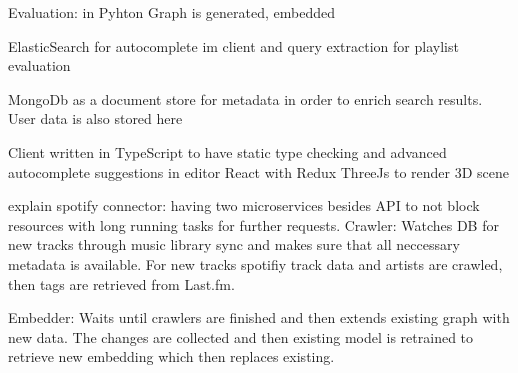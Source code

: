 \documentclass[a4paper]{llncs}
\begin{document}
	
	Evaluation:
	in Pyhton
	Graph is generated, embedded 
	
	
	ElasticSearch for autocomplete im client and query extraction for playlist evaluation
	
	MongoDb as a document store for metadata in order to enrich search results. User data is also stored here
	
	
	Client
	written in TypeScript to have static type checking and advanced autocomplete suggestions in editor
	React with Redux 
	ThreeJs to render 3D scene
	
	
	explain spotify connector:
	having two microservices besides API to not block resources with long running tasks for further requests. 
	Crawler: Watches DB for new tracks through music library sync and makes sure that all neccessary metadata is available. For new tracks spotifiy track data and artists are crawled, then tags are retrieved from Last.fm.
	
	Embedder: Waits until crawlers are finished and then extends existing graph with new data. The changes are collected and then existing model is retrained to retrieve new embedding which then replaces existing.
	
	
	
	
	
\end{document}
